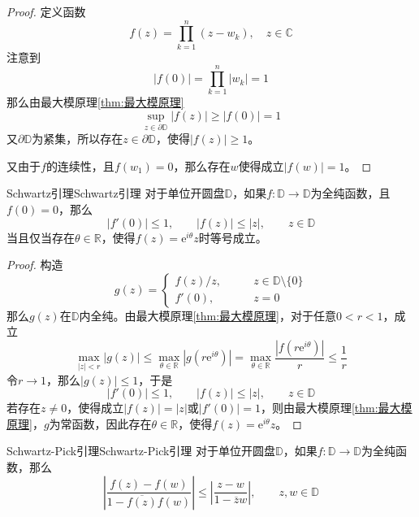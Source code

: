 \documentclass[lang = cn, scheme = chinese, thmcnt = section]{elegantbook}
\newcommand{\R}{\mathbb{R}}            %
\newcommand{\C}{\mathbb{C}}  		   %
\begin{document}
\begin{proof}
	定义函数
	$$
	f(z)=\prod_{k=1}^{n}(z-w_k),\quad z\in\C
	$$
	注意到
	$$
	|f(0)|=\prod_{k=1}^{n}|w_k|=1
	$$
	那么由最大模原理\ref{thm:最大模原理}
	$$
	\sup_{z\in\partial\mathbb{D}}|f(z)|\ge |f(0)|=1
	$$
	又$\partial\mathbb{D}$为紧集，所以存在$z\in\partial\mathbb{D}$，使得$|f(z)|\ge 1$。
	
	又由于$f$的连续性，且$f(w_1)=0$，那么存在$w$使得成立$|f(w)|=1$。
\end{proof}

\begin{theorem}{Schwartz引理}{Schwartz引理}
	对于单位开圆盘$\mathbb{D}$，如果$f:\mathbb{D}\to\mathbb{D}$为全纯函数，且$f(0)=0$，那么
	$$
	|f'(0)|\le 1,\qquad 
	|f(z)|\le|z|,\qquad
	z\in\mathbb{D}
	$$
	当且仅当存在$\theta\in\R$，使得$f(z)=\mathrm{e}^{i\theta}z$时等号成立。
\end{theorem}

\begin{proof}
	构造%
	$$
	g(z)=\begin{cases}
		f(z)/z,\qquad & z\in\mathbb{D}\setminus\{0\}\\
		f'(0),\qquad & z=0
	\end{cases}
	$$
	那么$g(z)$在$\mathbb{D}$内全纯。由最大模原理\ref{thm:最大模原理}，对于任意$0<r<1$，成立
	$$
	\max_{|z|<r}|g(z)|\le \max_{\theta\in\R}|g(r\mathrm{e}^{i\theta})|
	=\max_{\theta\in\R}\frac{|f(r\mathrm{e}^{i\theta})|}{r}\le\frac{1}{r}
	$$
	令$r\to 1$，那么$|g(z)|\le 1$，于是
	$$
	|f'(0)|\le 1,\qquad 
	|f(z)|\le|z|,\qquad
	z\in\mathbb{D}
	$$
	若存在$z\ne 0$，使得成立$|f(z)|=|z|$或$|f'(0)|=1$，则由最大模原理\ref{thm:最大模原理}，$g$为常函数，因此存在$\theta\in\R$，使得$f(z)=\mathrm{e}^{i\theta}z$。
\end{proof}

\begin{theorem}{Schwartz-Pick引理}{Schwartz-Pick引理}
	对于单位开圆盘$\mathbb{D}$，如果$f:\mathbb{D}\to\mathbb{D}$为全纯函数，那么
	$$
	\left| \frac{f(z)-f(w)}{1-\overline{f(z)}f(w)} \right|
	\le
	\left| \frac{z-w}{1-\overline{z}w} \right|,\qquad
	z,w\in\mathbb{D}
	$$
\end{theorem}
\end{document}
